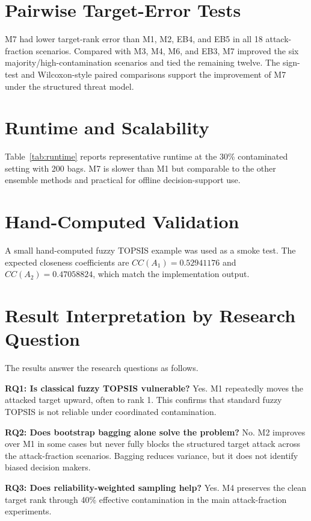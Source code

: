 \section{Pairwise Target-Error Tests}
M7 had lower target-rank error than M1, M2, EB4, and EB5 in all 18 attack-fraction scenarios. Compared with M3, M4, M6, and EB3, M7 improved the six majority/high-contamination scenarios and tied the remaining twelve. The sign-test and Wilcoxon-style paired comparisons support the improvement of M7 under the structured threat model.



\section{Runtime and Scalability}
Table~\ref{tab:runtime} reports representative runtime at the 30\% contaminated setting with 200 bags. M7 is slower than M1 but comparable to the other ensemble methods and practical for offline decision-support use.



\section{Hand-Computed Validation}
A small hand-computed fuzzy TOPSIS example was used as a smoke test. The expected closeness coefficients are \(CC(A_1)=0.52941176\) and \(CC(A_2)=0.47058824\), which match the implementation output.

\section{Result Interpretation by Research Question}

The results answer the research questions as follows.

\textbf{RQ1: Is classical fuzzy TOPSIS vulnerable?} Yes. M1 repeatedly moves the attacked target upward, often to rank 1. This confirms that standard fuzzy TOPSIS is not reliable under coordinated contamination.

\textbf{RQ2: Does bootstrap bagging alone solve the problem?} No. M2 improves over M1 in some cases but never fully blocks the structured target attack across the attack-fraction scenarios. Bagging reduces variance, but it does not identify biased decision makers.

\textbf{RQ3: Does reliability-weighted sampling help?} Yes. M4 preserves the clean target rank through 40\% effective contamination in the main attack-fraction experiments.

